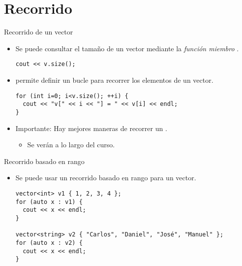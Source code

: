 \section{Recorrido}

\begin{frame}[fragile]{Recorrido de un vector}
\begin{itemize}
\item Se puede consultar el tamaño de un vector mediante la \emph{función miembro} .
\begin{lstlisting}
cout << v.size();
\end{lstlisting}
\item {} permite definir un bucle para recorrer los elementos de un vector.
\begin{lstlisting}
for (int i=0; i<v.size(); ++i) {
  cout << "v[" << i << "] = " << v[i] << endl;
}
\end{lstlisting}
  \item \alert{Importante}: Hay mejores maneras de recorrer un .
    \begin{itemize}
      \item Se verán a lo largo del curso.
    \end{itemize}
\end{itemize}
\end{frame}

\begin{frame}[t,fragile]{Recorrido basado en rango}
\begin{itemize}
  \item Se puede usar un recorrido basado en rango para un vector.
\begin{lstlisting}
vector<int> v1 { 1, 2, 3, 4 };
for (auto x : v1) {
  cout << x << endl;
}

vector<string> v2 { "Carlos", "Daniel", "José", "Manuel" };
for (auto x : v2) {
  cout << x << endl;
}
\end{lstlisting}
\end{itemize}
\end{frame}

